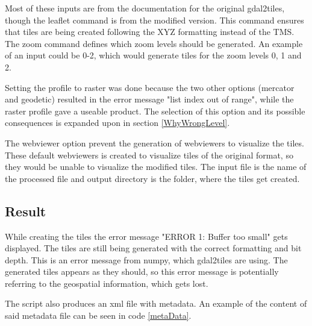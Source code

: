 Most of these inputs are from the documentation for the original gdal2tiles, though the leaflet command is from the modified version. This command ensures that tiles are being created following the XYZ formatting instead of the TMS. The zoom command defines which zoom levels should be generated. An example of an input could be 0-2, which would generate tiles for the zoom levels 0, 1 and 2. 

Setting the profile to raster was done because the two other options (mercator and geodetic) resulted in the error message "list index out of range", while the raster profile gave a useable product. The selection of this option and its possible consequences is expanded upon in section \ref{WhyWrongLevel}.   

The webviewer option prevent the generation of webviewers to visualize the tiles. These default webviewers is created to visualize tiles of the original format, so they would be unable to visualize the modified tiles. 
The input file is the name of the processed file and output directory is the folder, where the tiles get created. 
\subsection{Result}

While creating the tiles the error message "ERROR 1: Buffer too small" gets displayed. The tiles are still being generated with the correct formatting and bit depth. This is an error message from numpy, which gdal2tiles are using. 
\citep{MoreThan8}
The generated tiles appears as they should, so this error message is potentially referring to the geospatial information, which gets lost.


The script also produces an xml file with metadata. An example of the content of said metadata file can be seen in code \ref{metaData}.

